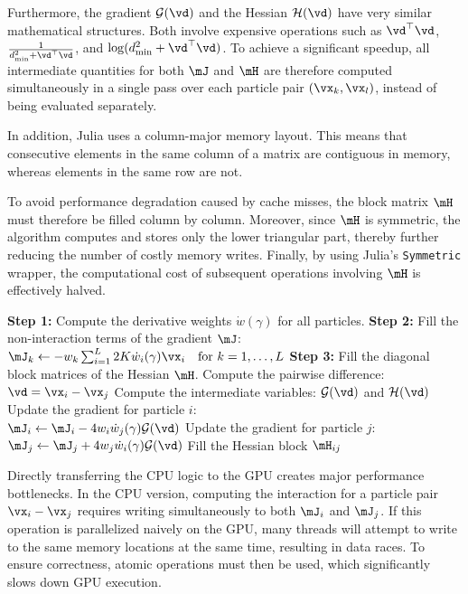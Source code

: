 Furthermore, the gradient $\mathcal{G}(\vd)$ and the Hessian $\mathcal{H}(\vd)$ have very similar mathematical structures. Both involve expensive operations such as $\vd^{\top}\vd$, $\frac{1}{d_{\text{min}}^2 + \vd^{\top}\vd}$, and $\log(d_\text{min}^2 + \vd^{\top}\vd)$. To achieve a significant speedup, all intermediate quantities for both $\mJ$ and $\mH$ are therefore computed simultaneously in a single pass over each particle pair $(\vx_k, \vx_l)$, instead of being evaluated separately.

In addition, Julia uses a column-major memory layout. This means that consecutive elements in the same column of a matrix are contiguous in memory, whereas elements in the same row are not.

To avoid performance degradation caused by cache misses, the block matrix $\mH$ must therefore be filled column by column. Moreover, since $\mH$ is symmetric, the algorithm computes and stores only the lower triangular part, thereby further reducing the number of costly memory writes. Finally, by using Julia's \texttt{Symmetric} wrapper, the computational cost of subsequent operations involving $\mH$ is effectively halved.

\begin{algorithm}[ht]
	\caption{Calculation of Gradient $\mJ$ and Hessian $\mH$}
	\label{alg:calc_JH}
	\begin{algorithmic}[1]
		\STATE \textbf{Step 1:} Compute the derivative weights $\dot{w}(\gamma)$ for all particles.
		\STATE \textbf{Step 2:} Fill the non-interaction terms of the gradient $\mJ$: \\
		$\mJ_k \gets -w_k \sum_{i=1}^L 2K\dot{w}_i(\gamma)\vx_i \quad \text{for } k = 1, \dots, L$
		\STATE \textbf{Step 3:} Fill the diagonal block matrices of the Hessian $\mH$.
		\STATE Compute the pairwise difference: $\vd = \vx_i - \vx_j$
		\STATE Compute the intermediate variables: $\mathcal{G}(\vd)$ and $\mathcal{H}(\vd)$
		\STATE Update the gradient for particle $i$: \\
		$\mJ_i \gets \mJ_i - 4 w_i \dot{w}_j(\gamma) \mathcal{G}(\vd)$
		\STATE Update the gradient for particle $j$: \\
		$\mJ_j \gets \mJ_j + 4 w_j \dot{w}_i(\gamma) \mathcal{G}(\vd)$
		\STATE Fill the Hessian block $\mH_{ij}$
		\ENDFOR
		\ENDFOR
	\end{algorithmic}
\end{algorithm}

Directly transferring the CPU logic to the GPU creates major performance bottlenecks. In the CPU version, computing the interaction for a particle pair $\vx_i - \vx_j$ requires writing simultaneously to both $\mJ_i$ and $\mJ_j$. If this operation is parallelized naively on the GPU, many threads will attempt to write to the same memory locations at the same time, resulting in data races. To ensure correctness, atomic operations must then be used, which significantly slows down GPU execution.

